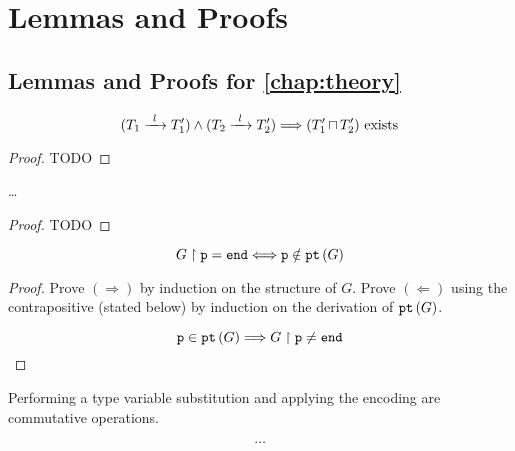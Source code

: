 \chapter{Lemmas and Proofs}

\section{Lemmas and Proofs for \cref{chap:theory}}
\label{section:proofs}

\begin{lemma}

\[
(\treduce{T_1}{T'_1}{l}) \wedge (\treduce{T_2}{T'_2}{l})
	\Longrightarrow
(\tmerge{T'_1}{T'_2}) \text{ exists}
\]

\label{lem:localltspreservemerge}
\end{lemma}

\begin{proof}
TODO
\end{proof}

\begin{lemma}

\dots

\label{lem:encglobalpreservemerge}
\end{lemma}

\begin{proof}
TODO
\end{proof}

\begin{lemma}

\[
{G} \upharpoonright {\mathtt{p}} = \textnormal{\texttt{end}} \Longleftrightarrow {\mathtt{p}} \notin {\textnormal{\texttt{pt}}\left({G}\right)}
\]

\label{lem:projpt}
\end{lemma}

\begin{proof} 
Prove $(\Longrightarrow)$ by induction on the structure of $G$.
Prove $(\Longleftarrow)$ using the contrapositive (stated below)
by induction on the derivation of ${\textnormal{\texttt{pt}}\left({G}\right)}$.

\[
{\mathtt{p}} \in {\textnormal{\texttt{pt}}\left({G}\right)} \Longrightarrow {G} \upharpoonright {\mathtt{p}} \neq \textnormal{\texttt{end}}
\]
\end{proof}

\begin{lemma}
Performing a type variable substitution and applying the
encoding are commutative operations.

\[ \dots \]

\label{lem:encsub}
\end{lemma}


